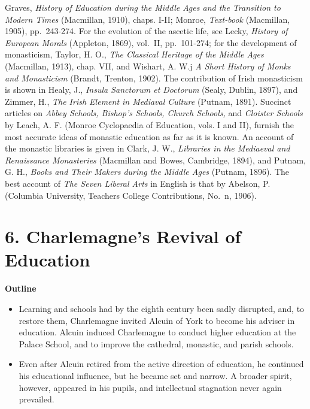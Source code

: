 \documentclass[]{book}
\providecommand{\tightlist}{%
  \setlength{\itemsep}{0pt}\setlength{\parskip}{0pt}}
\begin{document}
Graves, \emph{History of Education during the Middle Ages and the Transition to Modern Times} (Macmillan, 1910), chaps. I-II; Monroe, \emph{Text-book} (Macmillan, 1905), pp.~243-274. For the evolution of the ascetic life, see Lecky, \emph{History of European Morals} (Appleton, 1869), vol.~II, pp.~101-274; for the development of monasticism, Taylor, H. O., \emph{The Classical Heritage of the Middle Ages} (Macmillan, 1913), chap. VII, and Wishart, A. W.j \emph{A Short History of Monks and Monasticism} (Brandt, Trenton, 1902). The contribution of Irish monasticism is shown in Healy, J., \emph{Insula Sanctorum et Doctorum} (Sealy, Dublin, 1897), and Zimmer, H., \emph{The Irish Element in Mediaval Culture} (Putnam, 1891). Succinct articles on \emph{Abbey Schools, Bishop's Schools, Church Schools,} and \emph{Cloister Schools} by Leach, A. F. (Monroe Cyclopaedia of Education, vols. I and II), furnish the most accurate ideas of monastic education as far as it is known. An account of the monastic libraries is given in Clark, J. W., \emph{Libraries in the Mediaeval and Renaissance Monasteries} (Macmillan and Bowes, Cambridge, 1894), and Putnam, G. H., \emph{Books and Their Makers during the Middle Ages} (Putnam, 1896). The best account of \emph{The Seven Liberal Arts} in English is that by Abelson, P. (Columbia University, Teachers College Contributions, No.~n, 1906).

\hypertarget{charlemagnes-revival-of-education}{%
\chapter{6. Charlemagne's Revival of Education}\label{charlemagnes-revival-of-education}}

\textbf{Outline}

\begin{itemize}
\tightlist
\item
  Learning and schools had by the eighth century been sadly disrupted, and, to restore them, Charlemagne invited Alcuin of York to become his adviser in education. Alcuin induced Charlemagne to conduct higher education at the Palace School, and to improve the cathedral, monastic, and parish schools.
\item
  Even after Alcuin retired from the active direction of education, he continued his educational influence, but he became set and narrow. A broader spirit, however, appeared in his pupils, and intellectual stagnation never again prevailed.
\end{itemize}
\end{document}
